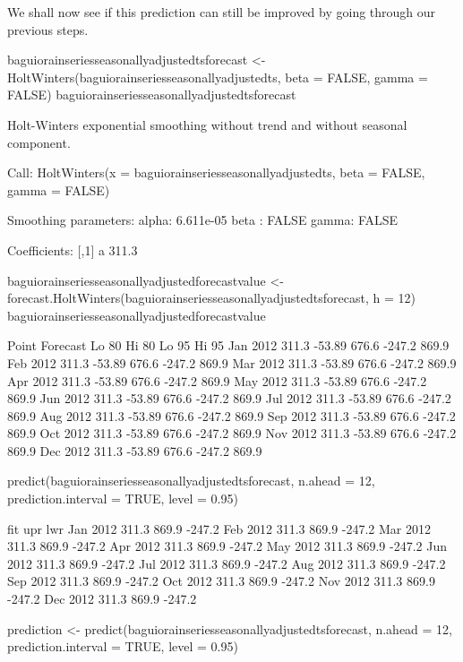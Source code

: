 \documentclass{article}\usepackage{graphicx, color}
\begin{document}
We shall now see if this prediction can still be improved by going through our previous steps.

\begin{Schunk}
\begin{Sinput}
baguiorainseriesseasonallyadjustedtsforecast <- HoltWinters(baguiorainseriesseasonallyadjustedts, 
    beta = FALSE, gamma = FALSE)
baguiorainseriesseasonallyadjustedtsforecast
\end{Sinput}
\begin{Soutput}
Holt-Winters exponential smoothing without trend and without seasonal component.

Call:
 HoltWinters(x = baguiorainseriesseasonallyadjustedts, beta = FALSE,      gamma = FALSE) 

Smoothing parameters:
 alpha:  6.611e-05 
 beta :  FALSE 
 gamma:  FALSE 

Coefficients:
   [,1]
a 311.3
\end{Soutput}
\begin{Sinput}
baguiorainseriesseasonallyadjustedforecastvalue <- forecast.HoltWinters(baguiorainseriesseasonallyadjustedtsforecast, 
    h = 12)
baguiorainseriesseasonallyadjustedforecastvalue
\end{Sinput}
\begin{Soutput}
         Point Forecast  Lo 80 Hi 80  Lo 95 Hi 95
Jan 2012          311.3 -53.89 676.6 -247.2 869.9
Feb 2012          311.3 -53.89 676.6 -247.2 869.9
Mar 2012          311.3 -53.89 676.6 -247.2 869.9
Apr 2012          311.3 -53.89 676.6 -247.2 869.9
May 2012          311.3 -53.89 676.6 -247.2 869.9
Jun 2012          311.3 -53.89 676.6 -247.2 869.9
Jul 2012          311.3 -53.89 676.6 -247.2 869.9
Aug 2012          311.3 -53.89 676.6 -247.2 869.9
Sep 2012          311.3 -53.89 676.6 -247.2 869.9
Oct 2012          311.3 -53.89 676.6 -247.2 869.9
Nov 2012          311.3 -53.89 676.6 -247.2 869.9
Dec 2012          311.3 -53.89 676.6 -247.2 869.9
\end{Soutput}
\begin{Sinput}
predict(baguiorainseriesseasonallyadjustedtsforecast, n.ahead = 12, prediction.interval = TRUE, 
    level = 0.95)
\end{Sinput}
\begin{Soutput}
           fit   upr    lwr
Jan 2012 311.3 869.9 -247.2
Feb 2012 311.3 869.9 -247.2
Mar 2012 311.3 869.9 -247.2
Apr 2012 311.3 869.9 -247.2
May 2012 311.3 869.9 -247.2
Jun 2012 311.3 869.9 -247.2
Jul 2012 311.3 869.9 -247.2
Aug 2012 311.3 869.9 -247.2
Sep 2012 311.3 869.9 -247.2
Oct 2012 311.3 869.9 -247.2
Nov 2012 311.3 869.9 -247.2
Dec 2012 311.3 869.9 -247.2
\end{Soutput}
\begin{Sinput}
prediction <- predict(baguiorainseriesseasonallyadjustedtsforecast, n.ahead = 12, 
    prediction.interval = TRUE, level = 0.95)
\end{Sinput}
\end{Schunk}
\end{document}
